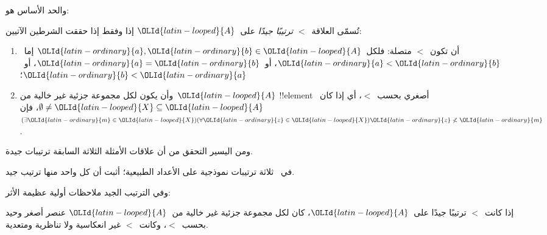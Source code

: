 \documentclass[../../../include/open-logic-section]{subfiles}
\begin{document}

والحد الأساس هو:

\begin{defn}
تُسمّى العلاقة~$<$ \emph{ترتيبًا جيدًا} على~${\OLId{latin-looped}{A}}$ إذا وفقط إذا حققت
الشرطين الآتيين:
\begin{enumerate}
\item أن تكون~$<$ متصلة: فلكل~${\OLId{latin-ordinary}{a}}, {\OLId{latin-ordinary}{b}} \in {\OLId{latin-looped}{A}}$ إما~${\OLId{latin-ordinary}{a}} < {\OLId{latin-ordinary}{b}}$،
	أو~${\OLId{latin-ordinary}{a}} = {\OLId{latin-ordinary}{b}}$، أو~${\OLId{latin-ordinary}{b}} < {\OLId{latin-ordinary}{a}}$؛
\item وأن يكون لكل مجموعة جزئية غير خالية من~${\OLId{latin-looped}{A}}$ !!{element} أصغري بحسب~$<$،
	أي إذا كان~$\emptyset \neq {\OLId{latin-looped}{X}} \subseteq {\OLId{latin-looped}{A}}$، فإن
	$(\exists {\OLId{latin-ordinary}{m}} \in {\OLId{latin-looped}{X}})(\forall {\OLId{latin-ordinary}{z}} \in {\OLId{latin-looped}{X}}){\OLId{latin-ordinary}{z}} \nless {\OLId{latin-ordinary}{m}}$.
\end{enumerate}
\end{defn}

ومن اليسير التحقق من أن علاقات الأمثلة الثلاثة السابقة ترتيبات جيدة.

\begin{prob}
في~ ثلاثة ترتيبات نموذجية على الأعداد
الطبيعية؛ أثبت أن كل واحد منها ترتيب جيد.
\end{prob}

وفي الترتيب الجيد ملاحظات أولية عظيمة الأثر:

\begin{prop}
إذا كانت~$<$ ترتيبًا جيدًا على~${\OLId{latin-looped}{A}}$، كان لكل مجموعة جزئية غير خالية من~${\OLId{latin-looped}{A}}$
عنصر أصغر وحيد بحسب~$<$، وكانت~$<$ غير انعكاسية ولا تناظرية ومتعدية.
\end{prop}
\end{document}
